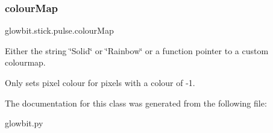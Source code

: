 \subsubsection{\texorpdfstring{colour\+Map}{colourMap}}
{\footnotesize\ttfamily glowbit.\+stick.\+pulse.\+colour\+Map}



Either the string \char`\"{}\+Solid\char`\"{} or \char`\"{}\+Rainbow\char`\"{} or a function pointer to a custom colourmap. 

Only sets pixel colour for pixels with a colour of -\/1. 

The documentation for this class was generated from the following file\+:\begin{DoxyCompactItemize}
\item 
glowbit.\+py\end{DoxyCompactItemize}
